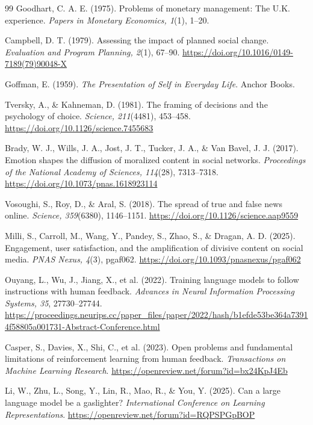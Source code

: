 \documentclass[11pt, letterpaper]{article}
\begin{document}
\begin{thebibliography}{99}
Goodhart, C. A. E. (1975).
Problems of monetary management: The U.K. experience.
\textit{Papers in Monetary Economics, 1}(1), 1--20.

Campbell, D. T. (1979).
Assessing the impact of planned social change.
\textit{Evaluation and Program Planning, 2}(1), 67--90.
\url{https://doi.org/10.1016/0149-7189(79)90048-X}

Goffman, E. (1959).
\textit{The Presentation of Self in Everyday Life}.
Anchor Books.

Tversky, A., \& Kahneman, D. (1981).
The framing of decisions and the psychology of choice.
\textit{Science, 211}(4481), 453--458.
\url{https://doi.org/10.1126/science.7455683}

Brady, W. J., Wills, J. A., Jost, J. T., Tucker, J. A., \& Van Bavel, J. J. (2017).
Emotion shapes the diffusion of moralized content in social networks.
\textit{Proceedings of the National Academy of Sciences, 114}(28), 7313--7318.
\url{https://doi.org/10.1073/pnas.1618923114}

Vosoughi, S., Roy, D., \& Aral, S. (2018).
The spread of true and false news online.
\textit{Science, 359}(6380), 1146--1151.
\url{https://doi.org/10.1126/science.aap9559}

Milli, S., Carroll, M., Wang, Y., Pandey, S., Zhao, S., \& Dragan, A. D. (2025).
Engagement, user satisfaction, and the amplification of divisive content on social media.
\textit{PNAS Nexus, 4}(3), pgaf062.
\url{https://doi.org/10.1093/pnasnexus/pgaf062}

Ouyang, L., Wu, J., Jiang, X., et al. (2022).
Training language models to follow instructions with human feedback.
\textit{Advances in Neural Information Processing Systems, 35}, 27730--27744.
\url{https://proceedings.neurips.cc/paper_files/paper/2022/hash/b1efde53be364a73914f58805a001731-Abstract-Conference.html}

Casper, S., Davies, X., Shi, C., et al. (2023).
Open problems and fundamental limitations of reinforcement learning from human feedback.
\textit{Transactions on Machine Learning Research}.
\url{https://openreview.net/forum?id=bx24KpJ4Eb}

Li, W., Zhu, L., Song, Y., Lin, R., Mao, R., \& You, Y. (2025).
Can a large language model be a gaslighter?
\textit{International Conference on Learning Representations}.
\url{https://openreview.net/forum?id=RQPSPGpBOP}


\end{thebibliography}
\end{document}
